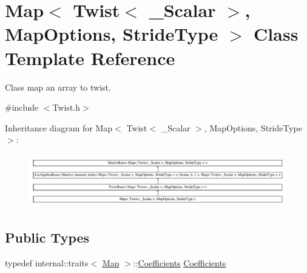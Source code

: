 \hypertarget{class_map_3_01_twist_3_01___scalar_01_4_00_01_map_options_00_01_stride_type_01_4}{}\section{Map$<$ Twist$<$ \+\_\+\+Scalar $>$, Map\+Options, Stride\+Type $>$ Class Template Reference}
\label{class_map_3_01_twist_3_01___scalar_01_4_00_01_map_options_00_01_stride_type_01_4}


Class map an array to twist.  




{\ttfamily \#include $<$Twist.\+h$>$}

Inheritance diagram for Map$<$ Twist$<$ \+\_\+\+Scalar $>$, Map\+Options, Stride\+Type $>$\+:\begin{figure}[H]
\begin{center}
\leavevmode
\includegraphics[height=2.333333cm]{class_map_3_01_twist_3_01___scalar_01_4_00_01_map_options_00_01_stride_type_01_4}
\end{center}
\end{figure}
\subsection*{Public Types}
\begin{DoxyCompactItemize}
\item 
typedef internal\+::traits$<$ \hyperlink{class_map_3_01_twist_3_01___scalar_01_4_00_01_map_options_00_01_stride_type_01_4_a7bc49d9365cdda555f4d107d55a1c6b2}{Map} $>$\+::\hyperlink{class_map_3_01_twist_3_01___scalar_01_4_00_01_map_options_00_01_stride_type_01_4_aed5862495c86340dcb689412d79eb66a}{Coefficients} \hyperlink{class_map_3_01_twist_3_01___scalar_01_4_00_01_map_options_00_01_stride_type_01_4_aed5862495c86340dcb689412d79eb66a}{Coefficients}
\end{DoxyCompactItemize}
